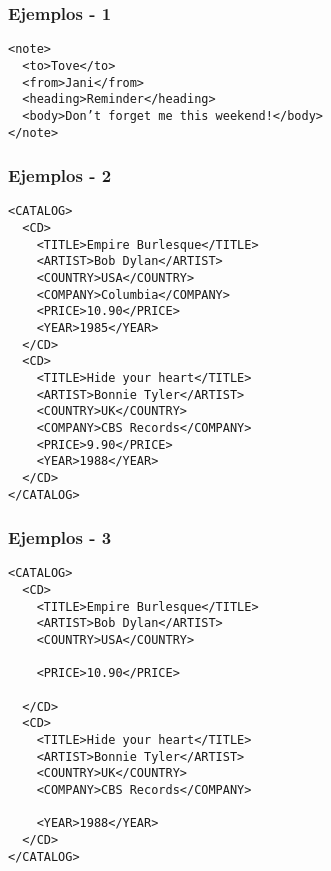 \begin{frame}
\frametitle{Ejemplos - 1}
\footnotesize
\texttt{<note>						\\
	~~<to>Tove</to>					\\
	~~<from>Jani</from>				\\
	~~<heading>Reminder</heading>			\\
	~~<body>Don't forget me this weekend!</body>	\\
	</note>
}
\end{frame}

\begin{frame}
\frametitle{Ejemplos - 2}
\footnotesize
\texttt{<CATALOG>				\\
	~~<CD>					\\
	~~~~<TITLE>Empire Burlesque</TITLE>	\\
	~~~~<ARTIST>Bob Dylan</ARTIST>		\\
	~~~~<COUNTRY>USA</COUNTRY>		\\
	~~~~<COMPANY>Columbia</COMPANY>		\\
	~~~~<PRICE>10.90</PRICE>		\\
	~~~~<YEAR>1985</YEAR>			\\
	~~</CD>					\\
	~~<CD>					\\
	~~~~<TITLE>Hide your heart</TITLE>	\\
	~~~~<ARTIST>Bonnie Tyler</ARTIST>	\\
	~~~~<COUNTRY>UK</COUNTRY>		\\
	~~~~<COMPANY>CBS Records</COMPANY>	\\
	~~~~<PRICE>9.90</PRICE>			\\
	~~~~<YEAR>1988</YEAR>			\\
	~~</CD>					\\
	</CATALOG>
}
\end{frame}

\begin{frame}
\frametitle{Ejemplos - 3}
\footnotesize
\texttt{<CATALOG>				\\
	~~<CD>					\\
	~~~~<TITLE>Empire Burlesque</TITLE>	\\
	~~~~<ARTIST>Bob Dylan</ARTIST>		\\
	~~~~<COUNTRY>USA</COUNTRY>		\\
	~					\\
	~~~~<PRICE>10.90</PRICE>		\\
	~					\\
	~~</CD>					\\
	~~<CD>					\\
	~~~~<TITLE>Hide your heart</TITLE>	\\
	~~~~<ARTIST>Bonnie Tyler</ARTIST>	\\
	~~~~<COUNTRY>UK</COUNTRY>		\\
	~~~~<COMPANY>CBS Records</COMPANY>	\\
	~					\\
	~~~~<YEAR>1988</YEAR>			\\
	~~</CD>					\\
	</CATALOG>
}
\end{frame}

